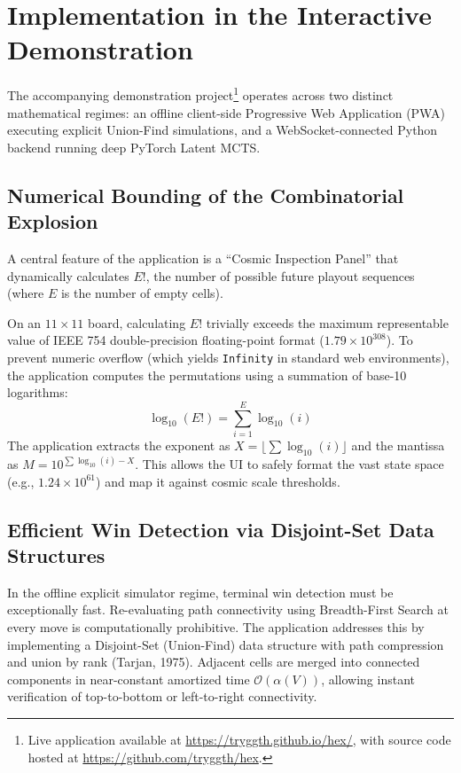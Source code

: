 \documentclass[12pt,a4paper]{article}
\begin{document}
\section{Implementation in the Interactive Demonstration}
The accompanying demonstration project\footnote{Live application available at \url{https://tryggth.github.io/hex/}, with source code hosted at \url{https://github.com/tryggth/hex}.} operates across two distinct mathematical regimes: an offline client-side Progressive Web Application (PWA) executing explicit Union-Find simulations, and a WebSocket-connected Python backend running deep PyTorch Latent MCTS.

\subsection{Numerical Bounding of the Combinatorial Explosion}
A central feature of the application is a ``Cosmic Inspection Panel'' that dynamically calculates $E!$, the number of possible future playout sequences (where $E$ is the number of empty cells). 

On an $11 \times 11$ board, calculating $E!$ trivially exceeds the maximum representable value of IEEE 754 double-precision floating-point format ($1.79 \times 10^{308}$). To prevent numeric overflow (which yields \texttt{Infinity} in standard web environments), the application computes the permutations using a summation of base-10 logarithms:
\begin{equation}
    \log_{10}(E!) = \sum_{i=1}^{E} \log_{10}(i)
\end{equation}
The application extracts the exponent as $X = \lfloor \sum \log_{10}(i) \rfloor$ and the mantissa as $M = 10^{\sum \log_{10}(i) - X}$. This allows the UI to safely format the vast state space (e.g., $1.24 \times 10^{61}$) and map it against cosmic scale thresholds.

\subsection{Efficient Win Detection via Disjoint-Set Data Structures}
In the offline explicit simulator regime, terminal win detection must be exceptionally fast. Re-evaluating path connectivity using Breadth-First Search at every move is computationally prohibitive. The application addresses this by implementing a Disjoint-Set (Union-Find) data structure with path compression and union by rank (Tarjan, 1975). Adjacent cells are merged into connected components in near-constant amortized time $\mathcal{O}(\alpha(V))$, allowing instant verification of top-to-bottom or left-to-right connectivity.
\end{document}
